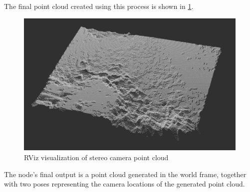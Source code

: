 The final point cloud created using this process is shown in \cref{fig:stereo_pc}.

\begin{figure}[h]
\centering
\includegraphics[scale=0.3]{images/stereo_camera_depth/stereo_pc.png}
\caption{RViz visualization of stereo camera point cloud}
\label{fig:stereo_pc}
\end{figure}

The node's final output is a point cloud generated in the world frame, together with two poses representing the camera locations of the generated point cloud.

\clearpage %






